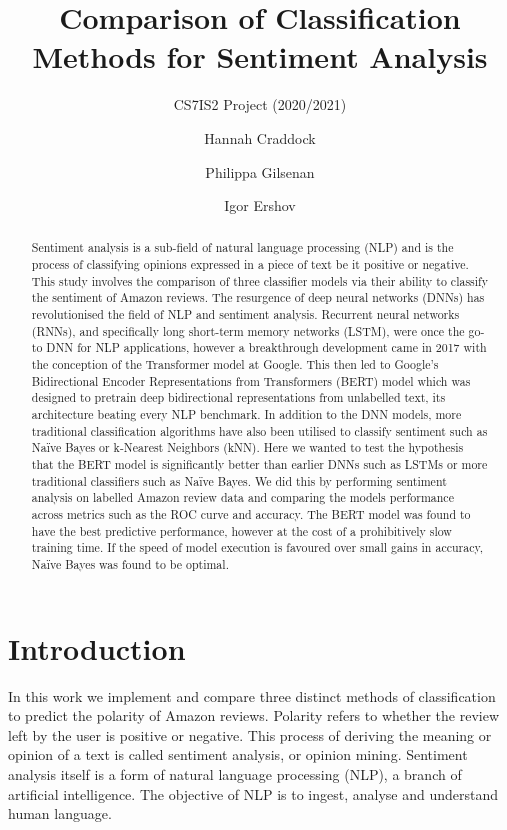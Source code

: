 \documentclass{svproc}
\begin{document}
\mainmatter
\title{Comparison of Classification Methods for Sentiment Analysis}
\subtitle{CS7IS2 Project (2020/2021)}
\author{Hannah Craddock \and Philippa Gilsenan \and Igor Ershov}


\maketitle              %

\begin{abstract}
Sentiment analysis is a sub-field of natural language processing (NLP) and is the process of classifying opinions expressed in a piece of text be it positive or negative. This study involves the comparison of three classifier models via their ability to classify the sentiment of Amazon reviews. The resurgence of deep neural networks (DNNs) has revolutionised the field of NLP and sentiment analysis. Recurrent neural networks (RNNs), and specifically long short-term memory networks (LSTM), were once the go-to DNN for NLP applications, however a breakthrough development came in 2017 with the conception of the Transformer model at Google. This then led to Google’s Bidirectional Encoder Representations from Transformers (BERT) model which was designed to pretrain deep bidirectional representations from unlabelled text, its architecture beating every NLP benchmark. In addition to the DNN models, more traditional classification algorithms have also been utilised to classify sentiment such as Naïve Bayes or k-Nearest Neighbors (kNN). Here we wanted to test the hypothesis that the BERT model is significantly better than earlier DNNs such as LSTMs or more traditional classifiers such as Naïve Bayes. We did this by performing sentiment analysis on labelled Amazon review data and comparing the models performance across metrics such as the ROC curve and accuracy. The BERT model was found to have the best predictive performance, however at the cost of a prohibitively slow training time. If the speed of model execution is favoured over small gains in accuracy, Naïve Bayes was found to be optimal.
\end{abstract}
%

\section{Introduction}
In this work we implement and compare three distinct methods of classification to predict the polarity of Amazon reviews. Polarity refers to whether the review left by the user is positive or negative. This process of deriving the meaning or opinion of a text is called sentiment analysis, or opinion mining. Sentiment analysis itself is a form of natural language processing (NLP), a branch of artificial intelligence. The objective of NLP is to ingest, analyse and understand human language.
\end{document}
